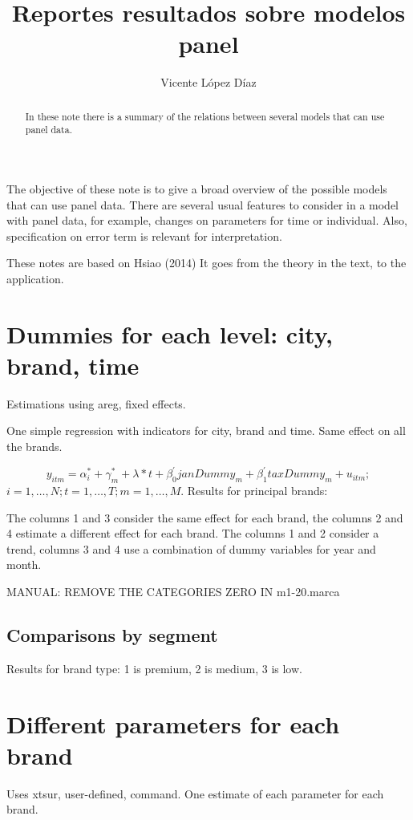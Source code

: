 \documentclass[]{article}
\title{Reportes resultados sobre modelos panel}
\author{Vicente López Díaz}
\begin{document}
\maketitle


\begin{abstract}
In these note there is a summary of the relations between several models that can use panel data.
\end{abstract}

The objective of these note is to give a broad overview of the possible models that can use panel data. There are several usual features to consider in a model with panel data, for example, changes on parameters for time or individual. Also, specification on error term is relevant for interpretation.

These notes are based on Hsiao (2014) 
It goes from the theory in the text, to the application.

\section{Dummies for each level: city, brand, time}
Estimations using areg, fixed effects.

One simple regression with indicators for city, brand and time.
Same effect on all the brands.

\begin{equation*} 
y_{itm}  = \alpha_{i}^{*} + \gamma_{m}^{*} + \lambda*t + \beta_{0}^{'}janDummy_{m} + \beta_{1}^{'}taxDummy_{m} + u_{itm}
;  
\end{equation*}
$i  = 1,\ldots,N;  t=1,\ldots,T; m=1,\ldots,M. $
Results for principal brands:



The columns 1 and 3 consider the same effect for each brand, the columns 2 and 4 estimate a different effect for each brand. The columns 1 and 2 consider a trend, columns 3 and 4 use a combination of dummy variables for year and month.

MANUAL: REMOVE THE CATEGORIES ZERO IN m1-20.marca

\subsection{Comparisons by segment}

Results for brand type: 1 is premium, 2 is medium, 3 is low.



\section{Different parameters for each brand}
Uses xtsur, user-defined, command.
One estimate of each parameter for each brand. 
\end{document}
